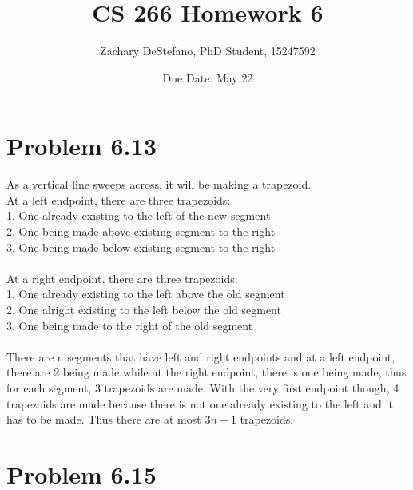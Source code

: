 \documentclass[11pt,psfig]{article}
\begin{document}
\setlength{\parskip}{1.2ex plus0.3ex minus 0.3ex}


\thispagestyle{empty} \pagestyle{myheadings} 



\title{CS 266 Homework 6}
\author{Zachary DeStefano, PhD Student, 15247592}
\date{Due Date: May 22}

\maketitle

\vfill\eject

\section*{Problem 6.13}

As a vertical line sweeps across, it will be making a trapezoid. \\
At a left endpoint, there are three trapezoids:\\
1. One already existing to the left of the new segment\\
2. One being made above existing segment to the right\\
3. One being made below existing segment to the right\\
\\
At a right endpoint, there are three trapezoids:\\
1. One already existing to the left above the old segment\\
2. One alright existing to the left below the old segment\\
3. One being made to the right of the old segment\\
\\
There are n segments that have left and right endpoints and at a left endpoint, there are 2 being made while at the right endpoint, there is one being made, thus for each segment, 3 trapezoids are made. With the very first endpoint though, 4 trapezoids are made because there is not one already existing to the left and it has to be made. Thus there are at most $3n+1$ trapezoids. 

\section*{Problem 6.15}
\end{document}
